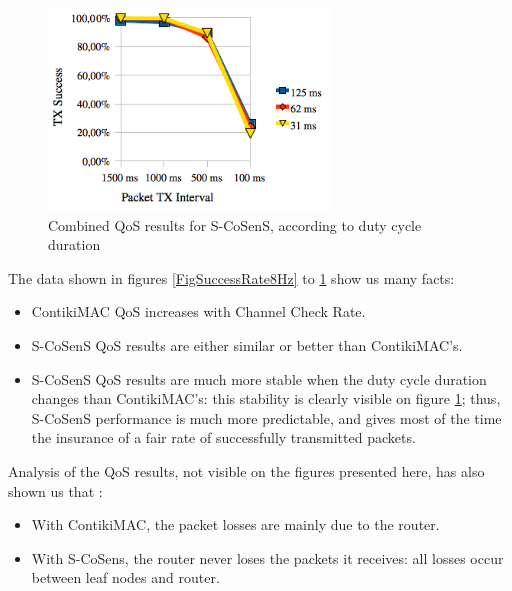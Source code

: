 \documentclass[a4paper,twoside]{article}
\begin{document}
\begin{figure}
  \centering
  \includegraphics[width=7.5cm]{graphes/QoSstabilitySCoSenS.png}
  \caption{Combined QoS results for S-CoSenS,
           according to duty cycle duration}
  \label{FigSuccessRateSCoSenS}
\end{figure}

The data shown in figures \ref{FigSuccessRate8Hz} to
\ref{FigSuccessRateSCoSenS} show us many facts:

\begin{itemize}

\item ContikiMAC QoS increases with Channel Check Rate.

\item S-CoSenS QoS results are either similar or better than ContikiMAC's.

\item S-CoSenS QoS results are much more stable when the duty cycle duration
      changes than ContikiMAC's: this stability is clearly visible on figure
      \ref{FigSuccessRateSCoSenS}; thus, S-CoSenS performance is much more
      predictable, and gives most of the time the insurance of a fair
      rate of successfully transmitted packets.

\end{itemize}

Analysis of the QoS results, not visible on the figures presented here, has
also shown us that :

\begin{itemize}

\item With ContikiMAC, the packet losses are mainly due to the router.

\item With S-CoSens, the router never loses the packets it receives:
      all losses occur between leaf nodes and router.

\end{itemize}
\end{document}
